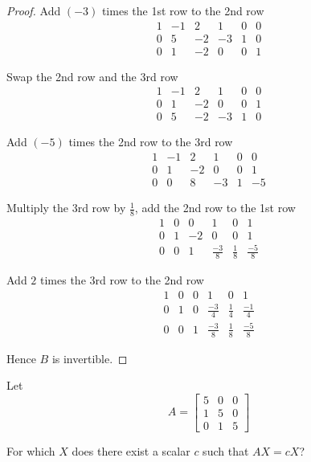 \begin{proof}
    Add $(-3)$ times the 1st row to the 2nd row
    \[
        \begin{array}{ccc|ccc}
            1 & -1 & 2  & 1  & 0 & 0 \\
            0 & 5  & -2 & -3 & 1 & 0 \\
            0 & 1  & -2 & 0  & 0 & 1
        \end{array}
    \]

    Swap the 2nd row and the 3rd row
    \[
        \begin{array}{ccc|ccc}
            1 & -1 & 2  & 1  & 0 & 0 \\
            0 & 1  & -2 & 0  & 0 & 1 \\
            0 & 5  & -2 & -3 & 1 & 0
        \end{array}
    \]

    Add $(-5)$ times the 2nd row to the 3rd row
    \[
        \begin{array}{ccc|ccc}
            1 & -1 & 2  & 1  & 0 & 0  \\
            0 & 1  & -2 & 0  & 0 & 1  \\
            0 & 0  & 8  & -3 & 1 & -5
        \end{array}
    \]

    Multiply the 3rd row by $\frac{1}{8}$, add the 2nd row to the 1st row
    \[
        \begin{array}{ccc|ccc}
            1 & 0 & 0  & 1            & 0           & 1            \\
            0 & 1 & -2 & 0            & 0           & 1            \\
            0 & 0 & 1  & \frac{-3}{8} & \frac{1}{8} & \frac{-5}{8}
        \end{array}
    \]

    Add $2$ times the 3rd row to the 2nd row
    \[
        \begin{array}{ccc|ccc}
            1 & 0 & 0 & 1            & 0           & 1            \\
            0 & 1 & 0 & \frac{-3}{4} & \frac{1}{4} & \frac{-1}{4} \\
            0 & 0 & 1 & \frac{-3}{8} & \frac{1}{8} & \frac{-5}{8}
        \end{array}
    \]

    Hence $B$ is invertible.
\end{proof}

\begin{exercise}
    Let
    \[
        A = \begin{bmatrix}
            5 & 0 & 0 \\
            1 & 5 & 0 \\
            0 & 1 & 5
        \end{bmatrix}
    \]

    For which $X$ does there exist a scalar $c$ such that $AX = cX$?
\end{exercise}

